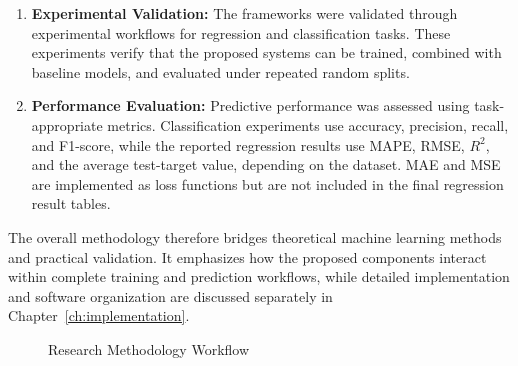 \begin{enumerate}
    \item \textbf{Experimental Validation:} The frameworks were validated through experimental workflows for regression and classification tasks. These experiments verify that the proposed systems can be trained, combined with baseline models, and evaluated under repeated random splits.

    \item \textbf{Performance Evaluation:} Predictive performance was assessed using task-appropriate metrics. Classification experiments use accuracy, precision, recall, and F1-score, while the reported regression results use MAPE, RMSE, $R^2$, and the average test-target value, depending on the dataset. MAE and MSE are implemented as loss functions but are not included in the final regression result tables.

\end{enumerate}

The overall methodology therefore bridges theoretical machine learning methods and practical validation. It emphasizes how the proposed components interact within complete training and prediction workflows, while detailed implementation and software organization are discussed separately in Chapter~\ref{ch:implementation}.

\begin{figure}[H]
    \centering
    \caption{Research Methodology Workflow}
    \label{fig:research_workflow}
\end{figure}

